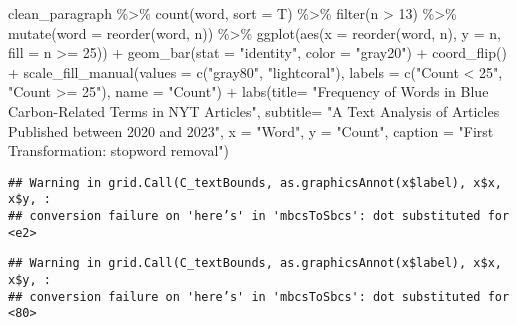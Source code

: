 \documentclass[
]{article}
\newenvironment{Shaded}{\begin{snugshade}}{\end{snugshade}}
\newcommand{\AttributeTok}[1]{\textcolor[rgb]{0.77,0.63,0.00}{#1}}
\newcommand{\DecValTok}[1]{\textcolor[rgb]{0.00,0.00,0.81}{#1}}
\newcommand{\FunctionTok}[1]{\textcolor[rgb]{0.00,0.00,0.00}{#1}}
\newcommand{\NormalTok}[1]{#1}
\newcommand{\SpecialCharTok}[1]{\textcolor[rgb]{0.00,0.00,0.00}{#1}}
\newcommand{\StringTok}[1]{\textcolor[rgb]{0.31,0.60,0.02}{#1}}
\begin{document}
\begin{Shaded}
\begin{Highlighting}[]
\NormalTok{clean\_paragraph }\SpecialCharTok{\%\textgreater{}\%}
  \FunctionTok{count}\NormalTok{(word, }\AttributeTok{sort =}\NormalTok{ T) }\SpecialCharTok{\%\textgreater{}\%}
  \FunctionTok{filter}\NormalTok{(n }\SpecialCharTok{\textgreater{}} \DecValTok{13}\NormalTok{) }\SpecialCharTok{\%\textgreater{}\%}
  \FunctionTok{mutate}\NormalTok{(}\AttributeTok{word =} \FunctionTok{reorder}\NormalTok{(word, n)) }\SpecialCharTok{\%\textgreater{}\%}
  \FunctionTok{ggplot}\NormalTok{(}\FunctionTok{aes}\NormalTok{(}\AttributeTok{x =} \FunctionTok{reorder}\NormalTok{(word, n), }\AttributeTok{y =}\NormalTok{ n, }\AttributeTok{fill =}\NormalTok{ n }\SpecialCharTok{\textgreater{}=} \DecValTok{25}\NormalTok{)) }\SpecialCharTok{+}
  \FunctionTok{geom\_bar}\NormalTok{(}\AttributeTok{stat =} \StringTok{"identity"}\NormalTok{, }\AttributeTok{color =} \StringTok{"gray20"}\NormalTok{) }\SpecialCharTok{+}
  \FunctionTok{coord\_flip}\NormalTok{() }\SpecialCharTok{+}
  \FunctionTok{scale\_fill\_manual}\NormalTok{(}\AttributeTok{values =} \FunctionTok{c}\NormalTok{(}\StringTok{"gray80"}\NormalTok{, }\StringTok{"lightcoral"}\NormalTok{), }
                    \AttributeTok{labels =} \FunctionTok{c}\NormalTok{(}\StringTok{"Count \textless{} 25"}\NormalTok{, }\StringTok{"Count \textgreater{}= 25"}\NormalTok{), }
                    \AttributeTok{name =} \StringTok{"Count"}\NormalTok{) }\SpecialCharTok{+}
  \FunctionTok{labs}\NormalTok{(}\AttributeTok{title=} \StringTok{"Frequency of Words in Blue Carbon{-}Related Terms in NYT Articles"}\NormalTok{,}
       \AttributeTok{subtitle=} \StringTok{"A Text Analysis of Articles Published between 2020 and 2023"}\NormalTok{,}
       \AttributeTok{x =} \StringTok{"Word"}\NormalTok{,}
       \AttributeTok{y =} \StringTok{"Count"}\NormalTok{,}
       \AttributeTok{caption =} \StringTok{"First Transformation: stopword removal"}\NormalTok{) }
\end{Highlighting}
\end{Shaded}

\begin{verbatim}
## Warning in grid.Call(C_textBounds, as.graphicsAnnot(x$label), x$x, x$y, :
## conversion failure on 'here’s' in 'mbcsToSbcs': dot substituted for <e2>
\end{verbatim}

\begin{verbatim}
## Warning in grid.Call(C_textBounds, as.graphicsAnnot(x$label), x$x, x$y, :
## conversion failure on 'here’s' in 'mbcsToSbcs': dot substituted for <80>
\end{verbatim}
\end{document}
